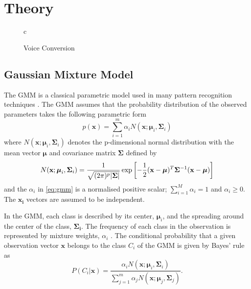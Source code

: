 \chapter{Theory} %
\label{cha:theory}

\begin{figure}[htbp]
  \centering
   \begin{tabular}[h]{c}
  \end{tabular}
  \caption{Voice Conversion}
  \label{fig:ADPCM}
\end{figure}

\section{Gaussian Mixture Model} %
\label{sec:gaussian_mixture_model}
The GMM is a classical parametric model used in many pattern recognition techniques \cite{stylianou98}. The GMM assumes that the probability distribution of the observed parameters takes the following parametric form
\begin{equation}
	\label{eq:gmm}
	p(\mathbf{x}) = \sum_{i=1}^{m} \alpha_i N(\mathbf{x}; \boldsymbol{\mu}_i, \mathbf{\Sigma}_i)
\end{equation}
where $N(\mathbf{x}; \mathbf{\mu}_i, \mathbf{\Sigma}_i)$ denotes the p-dimensional normal distribution with the mean vector $\boldsymbol{\mu}$ and covariance matrix $\mathbf{\Sigma}$ defined by
\begin{equation}
	N(\mathbf{x}; \boldsymbol{\mu}_i, \mathbf{\Sigma}_i) = \frac{1}{\sqrt{(2\pi)^p\lvert\mathbf{\Sigma}\rvert}} \exp\left[ -\frac{1}{2} (\mathbf{x} -\boldsymbol{\mu})^T \mathbf{\Sigma}^{-1} (\mathbf{x} -\boldsymbol{\mu})\right]
\end{equation}
and the $\alpha_i$ in \eqref{eq:gmm} is a normalised positive scalar; $\sum_{i=1}^{M}\alpha_i = 1$ and $\alpha_i \geq 0$. The $\mathbf{x_i}$ vectors are assumed to be independent.

In the GMM, each class is described by its center, $\boldsymbol{\mu}_i$, and the spreading around the center of the class, $\mathbf{\Sigma_i}$. The frequency of each class in the observation is represented by mixture weights, $\alpha_i$ \cite{stylianou98}. The conditional probability that a given observation vector $\mathbf{x}$ belongs to the class $C_i$ of the GMM is given by Bayes' rule \cite{statistikk} as
\begin{equation}
	\label{eq:bayes}
	P(C_i\vert \mathbf{x}) = \frac{\alpha_i N(\mathbf{x}; \boldsymbol{\mu}_i, \mathbf{\Sigma}_i)}{\sum_{j=1}^{m}\alpha_j N(\mathbf{x}; \boldsymbol{\mu}_j, \mathbf{\Sigma}_j)}.
\end{equation}

